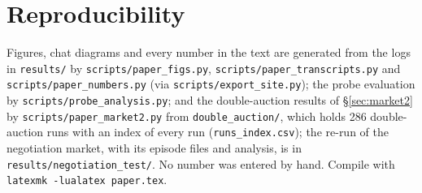 \documentclass{article}
\begin{document}
\section{Reproducibility}
Figures, chat diagrams and every number in the text are generated from the logs in \texttt{results/} by
\texttt{scripts/paper\_figs.py}, \texttt{scripts/paper\_transcripts.py} and \texttt{scripts/paper\_numbers.py} (via
\texttt{scripts/export\_site.py}); the probe evaluation by \texttt{scripts/probe\_analysis.py}; and the double-auction
results of \S\ref{sec:market2} by \texttt{scripts/paper\_market2.py} from \texttt{double\_auction/}, which holds 286
double-auction runs with an index of every run (\texttt{runs\_index.csv}); the re-run of the negotiation market, with its
episode files and analysis, is in \texttt{results/negotiation\_test/}. No number was entered by hand. Compile with
\texttt{latexmk -lualatex paper.tex}.
\end{document}
